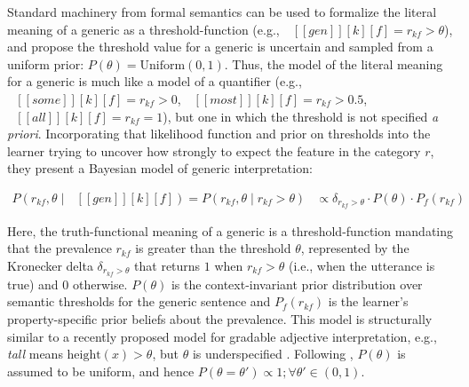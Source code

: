 \documentclass[floatsintext,doc]{apa6}
\newcommand{\denote}[1]{\mbox{ $[\![ #1 ]\!]$}}
\begin{document}
 
Standard machinery from formal semantics \cite{Montague1973} can be used to formalize the literal meaning of a generic as a threshold-function  (e.g., \(\mbox{ $[\![ gen ]\!][k][f]$} = r_{kf} > \theta\)), and  propose the threshold value for a generic is uncertain and sampled from a uniform prior: $P(\theta) = \text{Uniform}(0, 1)$. Thus, the model of the literal meaning for a generic is much like a model of a quantifier  (e.g., \(\mbox{ $[\![ some ]\!][k][f]$} = r_{kf} > 0\), \(\mbox{ $[\![ most ]\!][k][f]$} = r_{kf} > 0.5\), \(\mbox{ $[\![ all ]\!][k][f]$} = r_{kf} = 1\)), but one in which the threshold is not specified \emph{a priori}. 
Incorporating that likelihood function and prior on thresholds into the learner trying to uncover how strongly to expect the feature in the category $r$, they present a Bayesian model of generic interpretation: 

\begin{align}
P (r_{kf}, \theta \mid \denote{gen}[k][f]) = P (r_{kf}, \theta \mid r_{kf} >  \theta) &\propto \delta_{r_{kf} > \theta} \cdot P(\theta) \cdot P_f(r_{kf})  \label{eq:L0}
\end{align}


Here, the truth-functional meaning of a generic is a threshold-function mandating that the prevalence $r_{kf}$ is greater than the threshold \(\theta\), represented by the Kronecker delta $\delta_{r_{kf} > \theta}$ that returns \(1\) when \(r_{kf} > \theta\) (i.e., when the utterance is true) and \(0\) otherwise.
$P(\theta)$ is the context-invariant prior distribution over semantic thresholds for the generic sentence and $P_{f}(r_{kf})$ is the learner's property-specific prior beliefs about the prevalence.
This model is structurally similar to a recently proposed model for gradable adjective interpretation, e.g., \emph{tall} means $\text{height}(x) > \theta$, but $\theta$ is underspecified \cite{Lassiter2015}.
Following , $P(\theta)$ is assumed to be uniform, and hence $P(\theta = \theta') \propto 1; \forall \theta' \in (0, 1)$. 
\end{document}
